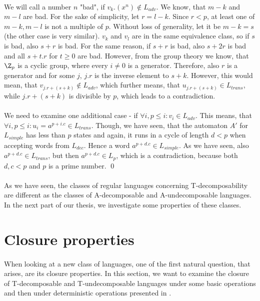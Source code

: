 \paragraph{}
We will call a number $n$ "bad", if $v_k.(x^{n}) \notin L_{adv}$. We know, that $m-k$ and $m-l$ are bad. For the sake of simplicity, let $r = l-k$. Since $r < p$, at least one of $m-k, m-l$ is not a multiple of $p$. Without loss of generality, let it be $m-k = s$ (the other case is very similar). $v_k$ and $v_l$ are in the same equivalence class, so if $s$ is bad, also $s+r$ is bad. For the same reason, if $s+r$ is bad, also $s+2r$ is bad and all $s+t.r$ for $t \geq 0$ are bad. However, from the group theory we know, that $\Z_p$ is a cyclic group, where every $i \neq 0$ is a generator. Therefore, also $r$ is a generator and for some $j$, $j.r$ is the inverse element to $s+k$. However, this would mean, that $v_{j.r+(s+k)} \notin L_{adv}$, which further means, that $u_{j.r+(s+k)} \in L_{trans}$, while $j.r+(s+k)$ is divisible by $p$, which leads to a contradiction.

\paragraph{}
We need to examine one additional case - if $\forall i, p \leq i: v_i \in L_{adv}$. This means, that $\forall i, p\leq i: u_i = a^{p+i.c} \in L_{trans}$. Though, we have seen, that the automaton $A'$ for $L_{simple}$ has less than $p$ states and again, it runs in a cycle of length $d < p$ when accepting words from $L_{dec}$. Hence a word $a^{p+d.c} \in L_{simple}$. As we have seen, also $a^{p+d.c} \in L_{trans}$, but then $a^{p+d.c} \in L_p$, which is a contradiction, because both $d,c<p$ and $p$ is a prime number. \qed

\paragraph{}
As we have seen, the classes of regular languages concerning T-decomposability are different as the classes of A-decomposable and A-undecomposable languages. In the next part of our thesis, we investigate some properties of these classes.

\section{Closure properties}

\paragraph{}
When looking at a new class of languages, one of the first natural question, that arises, are its closure properties.  In this section, we want to examine the closure of T-decomposable and T-undecomposable languages under some basic operations and then under deterministic operations presented in \cite{AFDL}.

